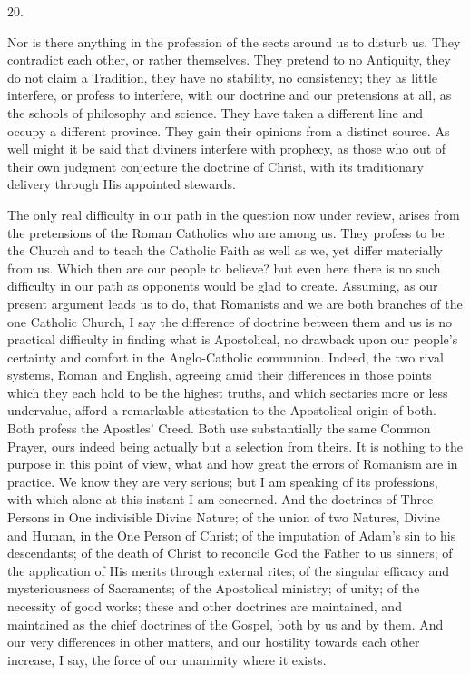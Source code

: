 20.

Nor is there anything in the profession of the sects around us to
disturb us. They contradict each other, or rather themselves. They
pretend to no Antiquity, they do not claim a Tradition, they have no
stability, no consistency; they as little interfere, or profess to
interfere, with our doctrine and our pretensions at all, as the
schools of philosophy and science. They have taken a different line
and occupy a different province. They gain their opinions from a
distinct source. As well might it be said that diviners interfere with
prophecy, as those who out of their own judgment conjecture the
doctrine of Christ, with its traditionary delivery through His
appointed stewards.

The only real difficulty in our path in the question now under
review, arises from the pretensions of the Roman Catholics who are
among us. They profess to be the Church and to teach the Catholic
Faith as well as we, yet differ materially from us. Which then are our
people to believe? but even here there is no such difficulty in our
path as opponents would be glad to create. Assuming, as our
present argument leads us to do, that Romanists and we are both
branches of the one Catholic Church, I say the difference of doctrine
between them and us is no practical difficulty in finding what is
Apostolical, no drawback upon our people's certainty and comfort in
the Anglo-Catholic communion. Indeed, the two rival systems, Roman and
English, agreeing amid their differences in those points which they
each hold to be the highest truths, and which sectaries more or less
undervalue, afford a remarkable attestation to the Apostolical origin
of both. Both profess the Apostles' Creed. Both use substantially the
same Common Prayer, ours indeed being actually but a selection from
theirs. It is nothing to the purpose in this point of view, what and
how great the errors of Romanism are in practice. We know they are
very serious; but I am speaking of its professions, with which alone
at this instant I am concerned. And the doctrines of Three Persons in
One indivisible Divine Nature; of the union of two Natures, Divine and
Human, in the One Person of Christ; of the imputation of Adam's sin to
his descendants; of the death of Christ to reconcile God the Father to
us sinners; of the application of His merits through external rites;
of the singular efficacy and mysteriousness of Sacraments; of the
Apostolical ministry; of unity; of the necessity of good works; these
and other doctrines are maintained, and maintained as the chief
doctrines of the Gospel, both by us and by them. And our very
differences in other matters, and our hostility towards each other
increase, I say, the force of our unanimity where it exists.

